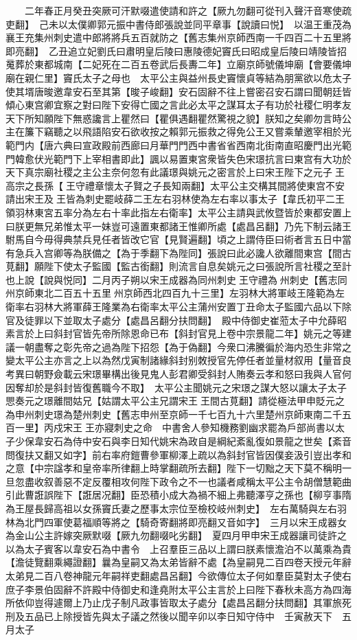 　　二年春正月癸丑突厥可汗默啜遣使請和許之【厥九勿翻可從刊入聲汗音寒使疏吏翻】　己未以太僕卿郭元振中書侍郎張說並同平章事【說讀曰悦】　以温王重茂為襄王充集州刺史遣中郎將將兵五百就防之【舊志集州京師西南一千四百二十五里將即亮翻】　乙丑追立妃劉氏曰肅明皇后陵曰惠陵德妃竇氏曰昭成皇后陵曰靖陵皆招䰟葬於東都城南【二妃死在二百五卷武后長夀二年】立廟京師號儀坤廟【會要儀坤廟在親仁里】竇氏太子之母也　太平公主與益州長史竇懷貞等結為朋黨欲以危太子使其壻唐晙邀韋安石至其第【晙子峻翻】安石固辭不往上嘗密召安石謂曰聞朝廷皆傾心東宫卿宜察之對曰陛下安得亡國之言此必太平之謀耳太子有功於社稷仁明孝友天下所知願陛下無惑讒言上瞿然曰【瞿俱遇翻瞿然驚視之貌】朕知之矣卿勿言時公主在簾下竊聽之以飛語陷安石欲收按之賴郭元振救之得免公王又嘗乘輦邀宰相於光範門内【唐六典曰宣政殿前西廊曰月華門門西中書省省西南北街南直昭慶門出光範門韓愈伏光範門下上宰相書即此】諷以易置東宮衆皆失色宋璟抗言曰東宫有大功於天下真宗廟社稷之主公主奈何忽有此議璟與姚元之密言於上曰宋王陛下之元子王高宗之長孫【王守禮章懷太子賢之子長知兩翻】太平公主交構其間將使東宫不安請出宋王及王皆為刺史罷岐薛二王左右羽林使為左右率以事太子【韋氏初平二王領羽林東宮五率分為左右十率此指左右衛率】太平公主請與武攸暨皆於東都安置上曰朕更無兄弟惟太平一妹豈可遠置東都諸王惟卿所處【處昌呂翻】乃先下制云諸王駙馬自今毋得典禁兵見任者皆改它官【見賢遍翻】頃之上謂侍臣曰術者言五日中當有急兵入宫卿等為朕備之【為于季翻下為陛同】張說曰此必讒人欲離間東宫【間古莧翻】願陛下使太子監國【監古銜翻】則流言自息矣姚元之曰張說所言社稷之至計也上說【說與悦同】二月丙子朔以宋王成器為同州刺史王守禮為州刺史【舊志同州京師東北二百五十五里州京師西北四百九十三里】左羽林大將軍岐王隆範為左衛率右羽林大將軍薛王隆業為右衛率太平公主蒲州安置丁丑命太子監國六品以下除官及徒罪以下並取太子處分【處昌呂翻分扶問翻】　殿中侍御史崔蒞太子中允薛昭素言於上曰斜封官皆先帝所除恩命已布【斜封官見上卷中宗景龍二年】姚元之等建議一朝盡奪之彰先帝之過為陛下招怨【為于偽翻】今衆口沸騰徧於海内恐生非常之變太平公主亦言之上以為然戊寅制諸緣斜封别敇授官先停任者並量材叙用【量音良　考異曰朝野僉載云宋璟畢構出後見鬼人彭君卿受斜封人賄奏云孝和怒曰我與人官何因奪却於是斜封皆復舊職今不取】　太平公主聞姚元之宋璟之謀大怒以讓太子太子愳奏元之璟離間姑兄【姑謂太平公主兄謂宋王王間古莧翻】請從極法甲申貶元之為申州刺史璟為楚州刺史【舊志申州至京師一千七百九十六里楚州京師東南二千五百一里】丙戍宋王王亦寢刺史之命　中書舍人參知機務劉幽求罷為戶部尚書以太子少保韋安石為侍中安石與李日知代姚宋為政自是綱紀紊亂復如景龍之世矣【紊音問復扶又翻又如字】前右率府鎧曹參軍柳澤上疏以為斜封官皆因僕妾汲引豈出孝和之意【中宗諡孝和皇帝率所律翻上時掌翻疏所去翻】陛下一切黜之天下莫不稱明一旦忽盡收叙善惡不定反覆相攻何陛下政令之不一也議者咸稱太平公主令胡僧慧範曲引此曹誑誤陛下【誑居况翻】臣恐積小成大為禍不細上弗聽澤亨之孫也【柳亨事隋為王屋長歸高祖以女孫竇氏妻之歷事太宗位至檢校岐州刺史】　左右萬騎與左右羽林為北門四軍使葛福順等將之【騎奇寄翻將即亮翻又音如字】　三月以宋王成器女為金山公主許嫁突厥默啜【厥九勿翻啜叱劣翻】　夏四月甲申宋王成器讓司徒許之以為太子賓客以韋安石為中書令　上召羣臣三品以上謂曰朕素懷澹泊不以萬乘為貴【澹徒覽翻乘繩證翻】曩為皇嗣又為太弟皆辭不處【為皇嗣見二百四卷天授元年辭太弟見二百八卷神龍元年嗣祥吏翻處昌呂翻】今欲傳位太子何如羣臣莫對太子使右庶子李景伯固辭不許殿中侍御史和逢堯附太平公主言於上曰陛下春秋未高方為四海所依仰豈得遽爾上乃止戊子制凡政事皆取太子處分【處昌呂翻分扶問翻】其軍旅死刑及五品已上除授皆先與太子議之然後以聞辛卯以李日知守侍中　壬寅赦天下　五月太子

